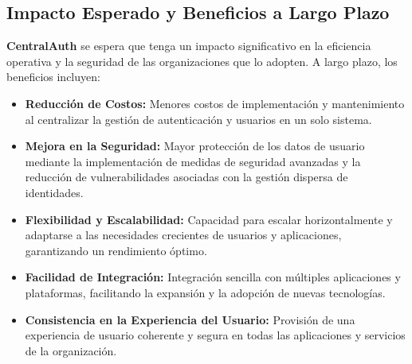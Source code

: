 \subsection{Impacto Esperado y Beneficios a Largo Plazo}

\textbf{CentralAuth} se espera que tenga un impacto significativo en la eficiencia operativa y la seguridad de las organizaciones que lo adopten. A largo plazo, los beneficios incluyen:

\begin{itemize}
    \item \textbf{Reducción de Costos:} Menores costos de implementación y mantenimiento al centralizar la gestión de autenticación y usuarios en un solo sistema.
    \item \textbf{Mejora en la Seguridad:} Mayor protección de los datos de usuario mediante la implementación de medidas de seguridad avanzadas y la reducción de vulnerabilidades asociadas con la gestión dispersa de identidades.
    \item \textbf{Flexibilidad y Escalabilidad:} Capacidad para escalar horizontalmente y adaptarse a las necesidades crecientes de usuarios y aplicaciones, garantizando un rendimiento óptimo.
    \item \textbf{Facilidad de Integración:} Integración sencilla con múltiples aplicaciones y plataformas, facilitando la expansión y la adopción de nuevas tecnologías.
    \item \textbf{Consistencia en la Experiencia del Usuario:} Provisión de una experiencia de usuario coherente y segura en todas las aplicaciones y servicios de la organización.
\end{itemize}

